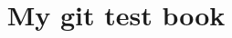 \documentclass[11pt]{book}
\title{My git test book}
\author{}
\begin{document}
\maketitle
\def\title#1{\chapter{#1}}
\tableofcontents

        
        
        
        
\end{document}
